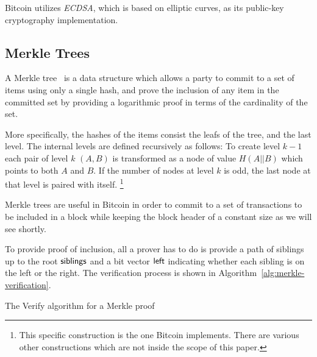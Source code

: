 Bitcoin utilizes \textit{ECDSA}, which is based on elliptic curves, as its public-key cryptography implementation.

\subsection{\label{sec:merkle-trees}Merkle Trees}
A Merkle tree~\cite{merkle} is a data structure which allows a party to commit to a set of items using only a single hash, and prove the inclusion of any item in the committed set by providing a logarithmic proof in terms of the cardinality of the set.

More specifically, the hashes of the items consist the leafs of the tree, and the last level. The internal levels are defined recursively as follows: To create level $k-1$ each pair of level $k$ $(A, B)$ is transformed as a node of value $H(A || B)$ which points to both $A$ and $B$. If the number of nodes at level $k$ is odd, the last node at that level is paired with itself.
\footnote{This specific construction is the one Bitcoin implements. There are various other constructions which are not inside the scope of this paper.}

Merkle trees are useful in Bitcoin in order to commit to a set of transactions to be included in a block while keeping the block header of a constant size as we will see shortly.

To provide proof of inclusion, all a prover has to do is provide a path of siblings up to the root $\sf{siblings}$ and a bit vector $\sf{left}$ indicating whether each sibling is on the left or the right. The verification process is shown in Algorithm~\ref{alg:merkle-verification}.

\begin{algorithm}[H]
  \caption{\label{alg:merkle-verification}The \textsf{Verify} algorithm
    for a Merkle proof}
    \begin{algorithmic}[1]
              \Else
              \EndIf
            \EndWhile
            \State{}
        \EndFunction
    \end{algorithmic}
\end{algorithm}

